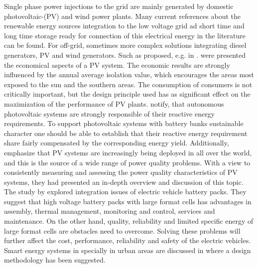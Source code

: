 Single phase power injections to the grid are mainly generated by domestic photovoltaic-(PV) and wind power plants. Many current references about the renewable energy sources integration to the low voltage grid ad short time and long time storage ready for connection of this electrical energy in the literature can be found. For off-grid, sometimes more complex solutions integrating diesel generators, PV and wind generators. Such as proposed, e.g. in \cite{shezan2016}. \cite{cucchiella2013environmental} were presented the economical aspects of a PV system. The economic results are strongly influenced by the annual average isolation value, which encourages the areas most exposed to the sun and the southern areas. The consumption of consumers is not critically important, but the design principle used has as significant effect on the maximization of the performance of PV plants. \cite{kaldellis2009optimum} notify, that autonomous photovoltaic systems are strongly responsible of their reactive energy requirements. To support photovoltaic systems with battery banks sustainable character one should be able to establish that their reactive energy requirement share fairly compensated by the corresponding energy yield.  Additionally, \cite{ortega2013measurement} emphasize that PV systems are increasingly being deployed in all over the world, and this is the source of a wide range of power quality problems. With a view to consistently measuring and assessing the power quality characteristics of PV systems, they had presented an in-depth overview and discussion of this topic. The study by \cite{huat2015integration} explored integration issues of electric vehicle battery packs. They suggest that high voltage battery packs with large format cells has advantages in assembly, thermal management, monitoring and control, services and maintenance. On the other hand, quality, reliability and limited specific energy of large format cells are obstacles need to overcome. Solving these problems will further affect the cost, performance, reliability and safety of the electric vehicles. Smart energy systems in specially in urban areas are discussed in \cite{lund2015smart} where a design methodology has been suggested.

